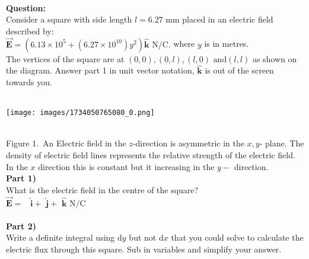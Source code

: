\documentclass[addpoints,12pt, margin-left=35px]{exam}
\begin{document}
\\


\newpage

\textbf{Question:}\\

Consider a square with side length $l = {6.27} \text{ mm}$ placed in an electric field described by:\\

$ \mathbf{\vec{E}} = \left( {6.13 \times 10^{5}} + ({6.27 \times 10^{10}}) y^2 \right) \mathbf{\hat{k}} \text{ N/C.}$ where $y$ is in metres.\\

The vertices of the square are at $(0,0), (0,l), (l,0) \text{ and} (l,l)$ as shown on the diagram. Answer part 1 in unit vector notation, $\mathbf{\hat{k}}$ is out of the screen towards you.\\

 \\

\begin{center}
\texttt{[image: images/1734050765080\_0.png]}
\end{center}\\

Figure 1. An Electric field in the $z$-direction is asymmetric in the $x,y$- plane. The density of electric field lines represents the relative strength of the electric field. In the $x$ direction this is constant but it increasing in the $y-$ direction.\\

\textbf{Part 1)}\\

What is the electric field in the centre of the square?\\

$\mathbf{\vec{E}} = $  \underline{\hspace{3cm}}  $ \mathbf{\hat{i}} + $  \underline{\hspace{3cm}}  $\mathbf{\hat{j}} + $ \underline{\hspace{3cm}}  $\mathbf{\hat{k}} \text{ N/C}$ \\

\\

\textbf{Part 2)}\\

Write a definite integral using $\mathrm{d} y$ but not $\mathrm{d} x$ that you could solve to calculate the electric flux through this square. Sub in variables and simplify your answer.\\
\end{document}
